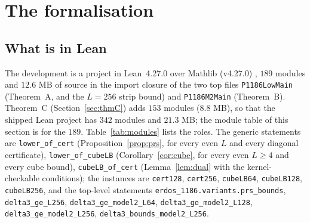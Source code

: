 \documentclass[11pt]{amsart}
\theoremstyle{remark}
\newcommand{\lean}[1]{\texttt{#1}}
\begin{document}
\section{The formalisation}\label{sec:formal}

\subsection{What is in Lean}
The development is a project in Lean~4.27.0 \cite{Lean4} over Mathlib (v4.27.0) \cite{Mathlib}, $189$ modules and $12.6$ MB of source in the import closure of the two top files \texttt{P1186LowMain} (Theorem~A, and the $L=256$ strip bound) and \texttt{P1186M2Main} (Theorem~B). Theorem~C (Section~\ref{sec:thmC}) adds $153$ modules ($8.8$ MB), so that the shipped Lean project has $342$ modules and $21.3$ MB; the module table of this section is for the $189$.
Table~\ref{tab:modules} lists the roles. The generic statements are \lean{lower\_of\_cert} (Proposition~\ref{prop:prs}, for every even $L$ and every diagonal certificate), \lean{lower\_of\_cubeLB} (Corollary~\ref{cor:cube}, for every even $L\ge4$ and every cube bound),
\lean{cubeLB\_of\_cert} (Lemma~\ref{lem:dual} with the kernel-checkable conditions); the instances are \lean{cert128}, \lean{cert256}, \lean{cubeLB64}, \lean{cubeLB128}, \lean{cubeLB256}, and the top-level statements
\lean{erdos\_1186.variants.prs\_bounds}, \lean{delta3\_ge\_L256}, \lean{delta3\_ge\_model2\_L64}, \lean{delta3\_ge\_model2\_L128}, \lean{delta3\_ge\_model2\_L256}, \lean{delta3\_bounds\_model2\_L256}.
\end{document}
